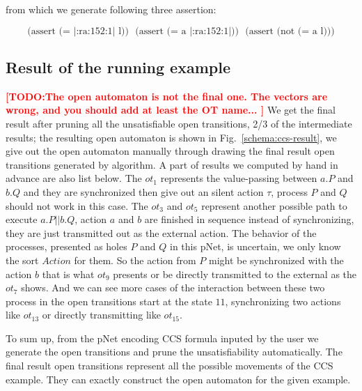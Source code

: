 \documentclass{lncs/llncs}
\newcommand{\TODO}[1]{\textcolor{red}{\textbf{[TODO:#1]}}}
\newcommand{\QIN}[1]{\textcolor{airforceblue}{#1}}
\begin{document}
from which we generate following three assertion:

\[\text{(assert\ (=\ |:ra:152:1|\ l))}\ \ \ \text{(assert\ (=\ a\ |:ra:152:1|))}\ \ \ \text{(assert\ (not\ (=\ a\ l)))}\]

\subsection{Result of the running example}
\label{section:full-result}
\TODO{The open automaton is not the final one. The vectors are wrong,
  and you should add at least the OT name... 
}
\QIN{
We get the final result after pruning all the unsatisfiable open transitions, 2/3 of the intermediate results; the resulting open automaton is shown in Fig.~\ref{schema:ccs-result}, we give out the open automaton manually through drawing the final result open transitions generated by algorithm. A part of results we computed by hand in advance are also list below. The $ot_1$ represents the value-passing between $a.P$ and $b.Q$ and they are synchronized then give out an silent action $\tau$, process $P$ and $Q$ should not work in this case. The $ot_3$ and $ot_5$ represent another possible path to execute $a.P||b.Q$, action $a$ and $b$ are finished in sequence instead of synchronizing, they are just transmitted out as the external action. The behavior of the processes, presented as holes $P$ and $Q$ in this pNet, is uncertain, we only know the sort $Action$ for them. So the action from $P$ might be synchronized with the action $b$ that is what $ot_9$ presents or be directly transmitted to the external as the $ot_7$ shows. And we can see more cases of the interaction between these two process in the open transitions start at the state $11$, synchronizing two actions like $ot_{13}$ or directly transmitting like $ot_{15}$.
}

\QIN{
To sum up, from the pNet encoding CCS formula inputed by the user we generate the open transitions and prune the unsatisfiability automatically. The final result open transitions represent all the possible movements of the CCS example. They can exactly construct the open automaton for the given example.
}
\end{document}
